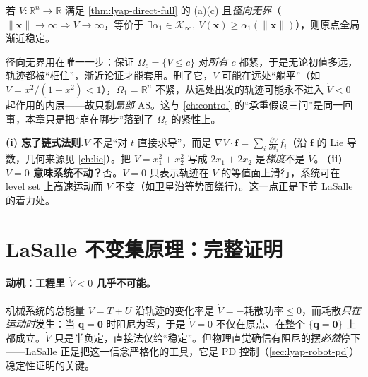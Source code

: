 \begin{theorem}
\label{thm:lyap-gas}
若 $V:\mathbb{R}^n\to\mathbb{R}$ 满足 \cref{thm:lyap-direct-full} 的 (a)(c) 且\emph{径向无界}（$\|\mathbf{x}\|\to\infty\Rightarrow V\to\infty$，等价于 $\exists\alpha_1\in\mathcal{K}_\infty,\ V(\mathbf{x})\ge\alpha_1(\|\mathbf{x}\|)$），则原点全局渐近稳定。
\end{theorem}

\begin{insight}
径向无界用在唯一一步：保证 $\Omega_c=\{V\le c\}$ 对\emph{所有} $c$ 都紧，于是无论初值多远，轨迹都被“框住”，渐近论证才能套用。删了它，$V$ 可能在远处“躺平”（如 $V=x^2/(1+x^2)<1$），$\Omega_1=\mathbb{R}^n$ 不紧，从远处出发的轨迹可能永不进入 $\dot V<0$ 起作用的内层——故只剩\emph{局部} AS。这与 \cref{ch:control} 的“承重假设三问”是同一回事，本章只是把“崩在哪步”落到了 $\Omega_c$ 的紧性上。
\end{insight}

\begin{pitfall}
\textbf{(i) 忘了链式法则.}\;$\dot V$ 不是“对 $t$ 直接求导”，而是 $\nabla V\cdot\mathbf{f}=\sum_i\frac{\partial V}{\partial x_i}f_i$（沿 $\mathbf{f}$ 的 Lie 导数，几何来源见 \cref{ch:lie}）。把 $V=x_1^2+x_2^2$ 写成 $2x_1+2x_2$ 是\emph{梯度}不是 $\dot V$。
\quad\textbf{(ii) $\dot V=0$ 意味系统不动？}\;否。$\dot V=0$ 只表示轨迹在 $V$ 的等值面上滑行，系统可在 level set 上高速运动而 $V$ 不变（如卫星沿等势面绕行）。这一点正是下节 LaSalle 的着力处。
\end{pitfall}

\section{LaSalle 不变集原理：完整证明}
\label{sec:lyap-lasalle}

\paragraph{动机：工程里 $\dot V<0$ 几乎不可能。}
机械系统的总能量 $V=T+U$ 沿轨迹的变化率是 $\dot V=-\text{耗散功率}\le0$，而耗散\emph{只在运动时}发生：当 $\dot{\mathbf{q}}=\mathbf{0}$ 时阻尼为零，于是 $\dot V=0$ 不仅在原点、在整个 $\{\dot{\mathbf{q}}=\mathbf{0}\}$ 上都成立。$\dot V$ 只是半负定，直接法仅给“稳定”。但物理直觉确信有阻尼的摆\emph{必然}停下——LaSalle 正是把这一信念严格化的工具，它是 PD 控制（\cref{sec:lyap-robot-pd}）稳定性证明的关键。

